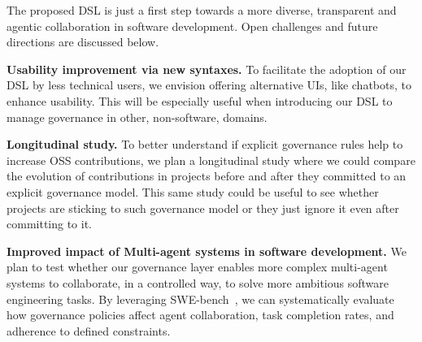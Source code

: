 The proposed DSL is just a first step towards a more diverse,  
transparent and agentic collaboration in software development. 
Open challenges and future directions are discussed below.

\smallskip
\noindent\textbf{Usability improvement via new syntaxes.}
To facilitate the adoption of our DSL by less technical users, we envision offering alternative UIs, like chatbots, to enhance usability.
This will be especially useful when introducing our DSL to manage governance in other, non-software, domains.

\smallskip
\noindent\textbf{Longitudinal study.}
To better understand if explicit governance rules help to increase 
OSS contributions,
we plan a longitudinal study where we could compare the evolution of contributions in projects before and after they committed to an explicit governance model. 
This same study could be useful to see whether projects are sticking to such governance model or they just ignore it even after committing to it. 


\smallskip
\noindent\textbf{Improved impact of Multi-agent systems in software development.}
We plan to test whether our governance layer enables more complex multi-agent systems to collaborate, in a controlled way, to solve more ambitious software engineering tasks. 
By leveraging SWE-bench~\cite{DBLP:conf/iclr/JimenezYWYPPN24}, we can systematically evaluate how governance policies affect agent collaboration, task completion rates, and adherence to defined constraints.

